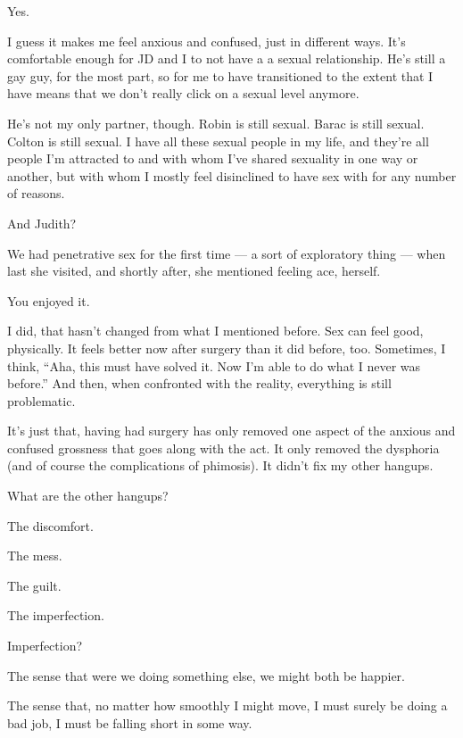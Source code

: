 \begin{leftcolumn}
\begin{ally}
Yes.
\end{ally}
I guess it makes me feel anxious and confused, just in different ways. It's comfortable enough for JD and I to not have a a sexual relationship. He's still a gay guy, for the most part, so for me to have transitioned to the extent that I have means that we don't really click on a sexual level anymore.

He's not my only partner, though. Robin is still sexual. Barac is still sexual. Colton is still sexual. I have all these sexual people in my life, and they're all people I'm attracted to and with whom I've shared sexuality in one way or another, but with whom I mostly feel disinclined to have sex with for any number of reasons.

\begin{ally}
And Judith?
\end{ally}
We had penetrative sex for the first time --- a sort of exploratory thing --- when last she visited, and shortly after, she mentioned feeling ace, herself.

\begin{ally}
You enjoyed it.
\end{ally}
I did, that hasn't changed from what I mentioned before. Sex can feel good, physically. It feels better now after surgery than it did before, too. Sometimes, I think, ``Aha, this must have solved it. Now I'm able to do what I never was before.'' And then, when confronted with the reality, everything is still problematic.

It's just that, having had surgery has only removed one aspect of the anxious and confused grossness that goes along with the act. It only removed the dysphoria (and of course the complications of phimosis). It didn't fix my other hangups.

\begin{ally}
What are the other hangups?
\end{ally}
The discomfort.

The mess.

The guilt.

The imperfection.

\begin{ally}
Imperfection?
\end{ally}
The sense that were we doing something else, we might both be happier.

The sense that, no matter how smoothly I might move, I must surely be doing a bad job, I must be falling short in some way.


\end{leftcolumn}
